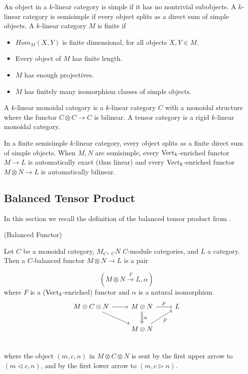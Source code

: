 \begin{definition} \cite{egno/tensor-cats}
  An object in a $k$-linear category is simple if it has no nontrivial
  subobjects. A $k$-linear category is semisimple if every object splits as a
  direct sum of simple objects. A $k$-linear category $M$ is finite if

  \begin{itemize}
    \item $Hom_M(X,Y)$ is finite dimensional, for all objects $X,Y\in M$.
    \item Every object of $M$ has finite length.
    \item $M$ has enough projectives.
    \item $M$ has finitely many isomorphism classes of simple objects.
  \end{itemize}
  A $k$-linear monoidal category is a $k$-linear category $C$ with a monoidal
  structure where the functor $C\otimes C\to C$ is bilinear. A tensor category
  is a rigid $k$-linear monoidal category.
\end{definition}

\noindent In a finite semisimple $k$-linear category, every object splits as a
finite direct sum of simple objects. When $M,N$ are semisimple, every
$\operatorname{Vect}_{k}$-enriched functor $M\to L$ is automatically exact (thus linear) and
every $\operatorname{Vect}_{k}$-enriched functor $M\otimes N\to L$ is automatically
bilinear.


\subsection{Balanced Tensor Product}\label{subsection/balanced-tensor-product}

\noindent In this section we recall the definition of the balanced tensor product
from \cite{douglas/balanced-product}.

\begin{definition} (Balanced Functor)

  \noindent Let $C$ be a monoidal category, $M_{C}$, $_{C}N$ $C$-module
  categories, and $L$ a category. \quad Then a $C$-balanced functor $M \otimes
  N\to L$ is a pair

  \[(M \otimes N \xrightarrow{F} L, \alpha)\]
  where $F$ is a ($\operatorname{Vect}_k$-enriched) functor and $\alpha$ is a natural isomorphism
  \[
    \begin{tikzcd}
      M \otimes C \otimes N \arrow[r] \arrow[dr] &
      M \otimes N \arrow[d, Rightarrow, "\alpha"] \arrow[r, "F"] &
      L \\
      & M \otimes N \arrow[ur, "F"'] \\
    \end{tikzcd}
  \]
  where the object $(m,c,n)$ in $M \otimes C \otimes N$ is sent by the first
  upper arrow to $(m \lhd c, n)$, and by the first lower arrow to $(m, c \rhd n)$.
\end{definition}

